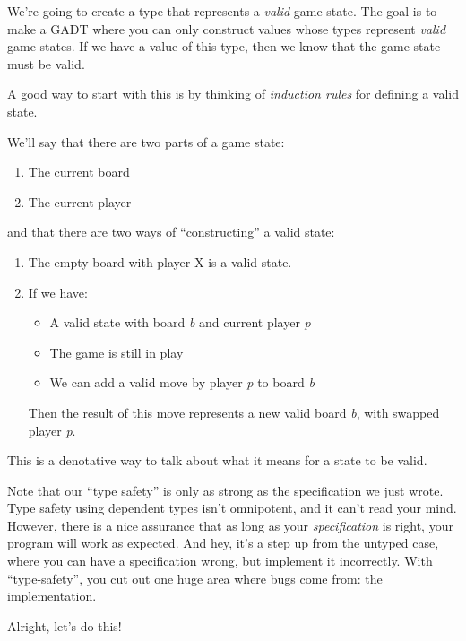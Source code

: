 \documentclass[]{article}
\begin{document}
We're going to create a type that represents a \emph{valid} game state. The goal
is to make a GADT where you can only construct values whose types represent
\emph{valid} game states. If we have a value of this type, then we know that the
game state must be valid.

A good way to start with this is by thinking of \emph{induction rules} for
defining a valid state.

We'll say that there are two parts of a game state:

\begin{enumerate}
\def\labelenumi{\arabic{enumi}.}
\tightlist
\item
  The current board
\item
  The current player
\end{enumerate}

and that there are two ways of ``constructing'' a valid state:

\begin{enumerate}
\def\labelenumi{\arabic{enumi}.}
\item
  The empty board with player X is a valid state.
\item
  If we have:

  \begin{itemize}
  \tightlist
  \item
    A valid state with board \emph{b} and current player \emph{p}
  \item
    The game is still in play
  \item
    We can add a valid move by player \emph{p} to board \emph{b}
  \end{itemize}

  Then the result of this move represents a new valid board \emph{b}, with
  swapped player \emph{p}.
\end{enumerate}

This is a denotative way to talk about what it means for a state to be valid.

Note that our ``type safety'' is only as strong as the specification we just
wrote. Type safety using dependent types isn't omnipotent, and it can't read
your mind. However, there is a nice assurance that as long as your
\emph{specification} is right, your program will work as expected. And hey, it's
a step up from the untyped case, where you can have a specification wrong, but
implement it incorrectly. With ``type-safety'', you cut out one huge area where
bugs come from: the implementation.

Alright, let's do this!
\end{document}
